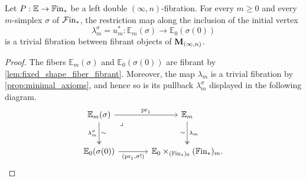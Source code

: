 \documentclass[10pt,reqno]{amsart}
\begin{document}
\begin{corollary}
\label{cor:fixed_simplex_source}
Let $P:\mathbb E\to\mathbb{F}\mathrm{in}_*$ be a left double
$(\infty,n)$-fibration. For every $m\geq0$ and every $m$-simplex
$\sigma$ of $\mathcal{F}\mathrm{in}_*$, the restriction map along the inclusion of
the initial vertex
\[
\lambda_m^\sigma=u_m^*:
\mathbb E_m(\sigma)\longrightarrow\mathbb E_0(\sigma(0))
\]
is a trivial fibration between fibrant objects of $\mathbf M_{(\infty,n)}$.
\end{corollary}

\begin{proof}
The fibers $\mathbb E_m(\sigma)$ and $\mathbb E_0(\sigma(0))$ are
fibrant by \cref{lem:fixed_shape_fiber_fibrant}. Moreover, the map
$\lambda_m$ is a trivial fibration by \cref{prop:minimal_axioms}, and
hence so is its pullback $\lambda_m^\sigma$ displayed in the
following diagram.
\[
\begin{tikzcd}[ampersand replacement=\&, sep=large]
\mathbb E_m(\sigma)\arrow[r,"\pr_1"]
  \arrow[d,two heads,"\lambda_m^\sigma"',"\sim"]
  \arrow[dr,phantom,"\lrcorner",very near start]
\&\mathbb E_m\arrow[d,two heads,"\lambda_m","\sim"']\\
\mathbb E_0(\sigma(0))
  \arrow[r,"{(\pr_1,\sigma !)}"']
\&\mathbb E_0\times_{(\bisimFin)_0}(\bisimFin)_m.
\end{tikzcd}
\]
\end{proof}
\end{document}
